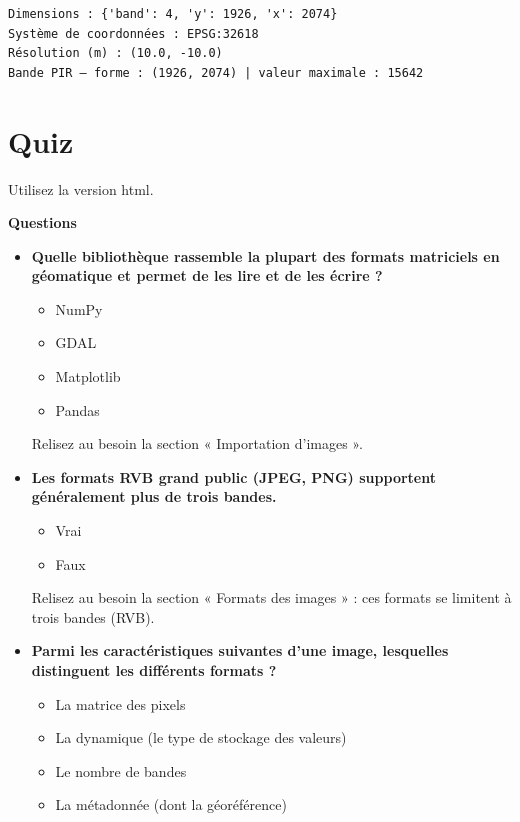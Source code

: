 \documentclass[
  french,
  11pt,
  letterpaper,
  open=any,
  twoside=false,
  french]{scrbook}
\providecommand{\tightlist}{%
  \setlength{\itemsep}{0pt}\setlength{\parskip}{0pt}}
\begin{document}
\begin{verbatim}
Dimensions : {'band': 4, 'y': 1926, 'x': 2074}
Système de coordonnées : EPSG:32618
Résolution (m) : (10.0, -10.0)
Bande PIR — forme : (1926, 2074) | valeur maximale : 15642
\end{verbatim}

\section{Quiz}\label{quiz-1}

Utilisez la version html.

\textbf{Questions}

\begin{itemize}
\item
  \textbf{Quelle bibliothèque rassemble la plupart des formats
  matriciels en géomatique et permet de les lire et de les écrire ?}

  \begin{itemize}
  \tightlist
  \item
    NumPy
  \item
    GDAL
  \item
    Matplotlib
  \item
    Pandas
  \end{itemize}

  Relisez au besoin la section « Importation d'images ».
\item
  \textbf{Les formats RVB grand public (JPEG, PNG) supportent
  généralement plus de trois bandes.}

  \begin{itemize}
  \tightlist
  \item
    Vrai
  \item
    Faux
  \end{itemize}

  Relisez au besoin la section « Formats des images » : ces formats se
  limitent à trois bandes (RVB).
\item
  \textbf{Parmi les caractéristiques suivantes d'une image, lesquelles
  distinguent les différents formats ?}

  \begin{itemize}
  \tightlist
  \item
    La matrice des pixels
  \item
    La dynamique (le type de stockage des valeurs)
  \item
    Le nombre de bandes
  \item
    La métadonnée (dont la géoréférence)
  \end{itemize}


\end{itemize}
\end{document}
